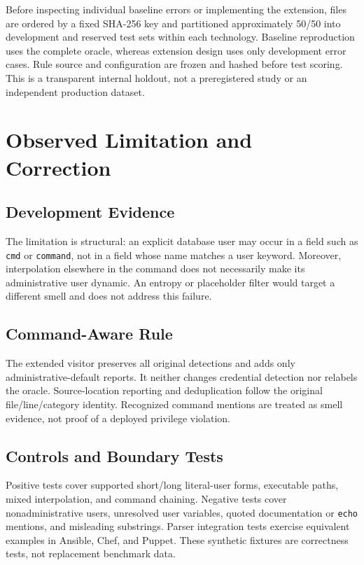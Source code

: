 \documentclass[conference]{IEEEtran}
\begin{document}
Before inspecting individual baseline errors or implementing the extension, files are ordered by a fixed SHA-256 key and partitioned approximately 50/50 into development and reserved test sets within each technology. \PartitionDescription{}
Baseline reproduction uses the complete oracle, whereas extension design uses only development error cases. Rule source and configuration are frozen and hashed before test scoring. This is a transparent internal holdout, not a preregistered study or an independent production dataset.

\section{Observed Limitation and Correction}
\subsection{Development Evidence}
\DevelopmentEvidence{}
The limitation is structural: an explicit database user may occur in a field such as \texttt{cmd} or \texttt{command}, not in a field whose name matches a user keyword. Moreover, interpolation elsewhere in the command does not necessarily make its administrative user dynamic. An entropy or placeholder filter would target a different smell and does not address this failure.

\subsection{Command-Aware Rule}
\RuleDescription{}
The extended visitor preserves all original detections and adds only administrative-default reports. It neither changes credential detection nor relabels the oracle. Source-location reporting and deduplication follow the original file/line/category identity. Recognized command mentions are treated as smell evidence, not proof of a deployed privilege violation.

\subsection{Controls and Boundary Tests}
Positive tests cover supported short/long literal-user forms, executable paths, mixed interpolation, and command chaining. Negative tests cover nonadministrative users, unresolved user variables, quoted documentation or \texttt{echo} mentions, and misleading substrings. Parser integration tests exercise equivalent examples in Ansible, Chef, and Puppet. These synthetic fixtures are correctness tests, not replacement benchmark data.
\end{document}
